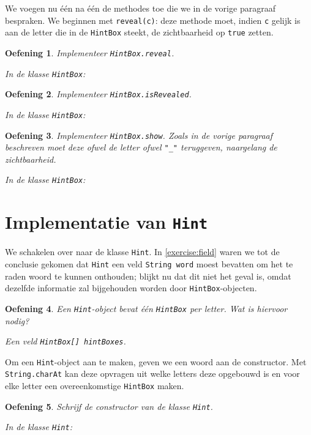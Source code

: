 \documentclass[a4paper,dutch]{article}
\newtheorem{exercise}{Oefening}[section]
\newcommand{\code}[2][]{
  
}
\begin{document}
We voegen nu \'e\'en na \'e\'en de methodes toe die we in de vorige paragraaf bespraken.
We beginnen met {\tt reveal(c)}: deze methode moet, indien {\tt c} gelijk is aan de letter
die in de {\tt HintBox} steekt, de zichtbaarheid op {\tt true} zetten.

\begin{exercise}
Implementeer {\tt HintBox.reveal}.
\begin{solution}
In de klasse {\tt HintBox}:
\code{hintbox-reveal.java}
\end{solution}
\end{exercise}

\begin{exercise}
Implementeer {\tt HintBox.isRevealed}.
\begin{solution}
In de klasse {\tt HintBox}:
\code{hintbox-isrevealed.java}
\end{solution}
\end{exercise}

\begin{exercise}
Implementeer {\tt HintBox.show}. Zoals in de vorige paragraaf beschreven moet deze ofwel
de letter ofwel \verb'"_"' teruggeven, naargelang de zichtbaarheid.
\begin{solution}
In de klasse {\tt HintBox}:
\code{hintbox-show.java}
\end{solution}
\end{exercise}

\section{Implementatie van {\tt Hint}}
We schakelen over naar de klasse {\tt Hint}. In \cref{exercise:field} waren we
tot de conclusie gekomen dat {\tt Hint} een veld {\tt String word} moest
bevatten om het te raden woord te kunnen onthouden; blijkt
nu dat dit niet het geval is, omdat dezelfde informatie
zal bijgehouden worden door {\tt HintBox}-objecten.

\begin{exercise}
Een {\tt Hint}-object bevat \'e\'en {\tt HintBox} per letter. Wat is hiervoor nodig?
\begin{solution}
Een veld {\tt HintBox[] hintBoxes}.
\end{solution}
\end{exercise}

Om een {\tt Hint}-object aan te maken, geven we een woord aan de constructor.
Met {\tt String.charAt} kan deze opvragen uit welke letters deze opgebouwd is
en voor elke letter een overeenkomstige {\tt HintBox} maken.
\begin{exercise}
Schrijf de constructor van de klasse {\tt Hint}.
\begin{solution}
In de klasse {\tt Hint}:
\code{hint-constructor.java}
\end{solution}
\end{exercise}
\end{document}

